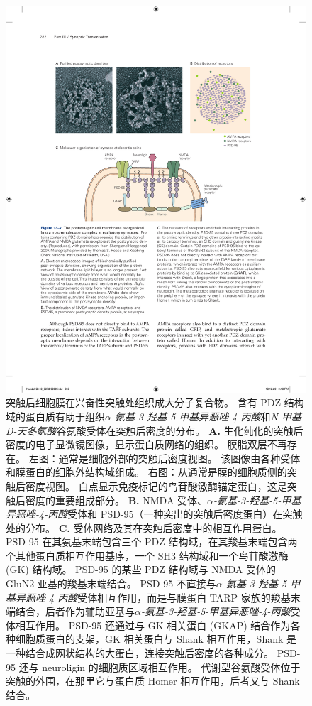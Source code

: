 \begin{figure}[htbp]
	\centering
	\includegraphics[width=0.7\linewidth]{chap13/fig_13_7}
	\caption{突触后细胞膜在兴奋性突触处组织成大分子复合物。
		含有 PDZ 结构域的蛋白质有助于组织\textit{$\alpha$-氨基-3-羟基-5-甲基异恶唑-4-丙酸}和\textit{N-甲基-D-天冬氨酸}谷氨酸受体在突触后密度的分布\cite{sheng2007postsynaptic}。
		\textbf{A.} 生化纯化的突触后密度的电子显微镜图像，显示蛋白质网络的组织。
		膜脂双层不再存在。
		左图：通常是细胞外部的突触后密度视图。
		该图像由各种受体和膜蛋白的细胞外结构域组成。
		右图：从通常是膜的细胞质侧的突触后密度视图。
		白点显示免疫标记的鸟苷酸激酶锚定蛋白，这是突触后密度的重要组成部分。
		\textbf{B.} NMDA 受体、\textit{$\alpha$-氨基-3-羟基-5-甲基异恶唑-4-丙酸}受体和 PSD-95（一种突出的突触后密度蛋白）在突触处的分布。
		\textbf{C.} 受体网络及其在突触后密度中的相互作用蛋白。
		PSD-95 在其氨基末端包含三个 PDZ 结构域，在其羧基末端包含两个其他蛋白质相互作用基序，一个 SH3 结构域和一个鸟苷酸激酶 (GK) 结构域。
		PSD-95 的某些 PDZ 结构域与 NMDA 受体的 GluN2 亚基的羧基末端结合。
		PSD-95 不直接与\textit{$\alpha$-氨基-3-羟基-5-甲基异恶唑-4-丙酸}受体相互作用，而是与膜蛋白 TARP 家族的羧基末端结合，后者作为辅助亚基与\textit{$\alpha$-氨基-3-羟基-5-甲基异恶唑-4-丙酸}受体相互作用。
		PSD-95 还通过与 GK 相关蛋白 (GKAP) 结合作为各种细胞质蛋白的支架，GK 相关蛋白与 Shank 相互作用，Shank 是一种结合成网状结构的大蛋白，连接突触后密度的各种成分。
		PSD-95 还与 neuroligin 的细胞质区域相互作用。
		代谢型谷氨酸受体位于突触的外围，在那里它与蛋白质 Homer 相互作用，后者又与 Shank 结合。}
	\label{fig:13_7}
\end{figure}


